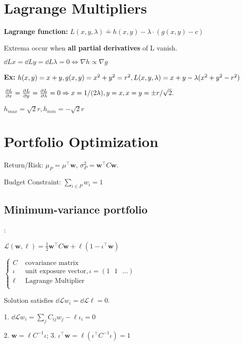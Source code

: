 \section{Lagrange Multipliers}

\textbf{Lagrange function:} $L(x,y,\lambda) \doteq h(x,y) - \lambda \cdot (g(x,y) - c)$

Extrema occur when \textbf{all partial derivatives} of L vanish.

$\dd{L}{x} = \dd{L}{y} = \dd{L}{\lambda} = 0 \iff \nabla h \propto \nabla g$

\textbf{Ex:} $h(x,y) = x+y,\\ g(x,y)=x^2 + y^2 = r^2, \\ L(x,y,\lambda) = x + y - \lambda(x^2+y^2-r^2)$

$\frac{\partial L}{\partial x} = \frac{\partial L}{\partial y} = \frac{\partial L}{\partial \lambda} = 0 \Rightarrow \\ x=1/(2\lambda), y=x, x=y=\pm r/\sqrt{2}.$

$h_{max} = \sqrt{2}r, h_{min} = -\sqrt{2}r$

\section{Portfolio Optimization}

Return/Risk: $\mu_P = \mu^\top \pmb{w}$, $\sigma^2_P = \pmb{w}^\top C \pmb{w}$.

Budget Constraint: $\sum_{i \in P} w_i = 1$


\subsection{Minimum-variance portfolio}:

$\mathcal{L}(\pmb{w}, \mathcal{\ell}) = \frac{1}{2}\pmb{w}^\top C \pmb{w} + \ell(1-\iota^\top\pmb{w})$

$\begin{cases}
    C & \text{ covariance matrix} \\
    \iota & \text{ unit exposure vector}, \iota = (1\text{ } 1 \text{ } \ldots) \\
    \ell & \text{ Lagrange Multiplier} \\
\end{cases}$

Solution satisfies $\dd{\mathcal{L}}{w_i} = \dd{\mathcal{L}}{\ell} = 0.$

1. $\dd{\mathcal{L}}{w_i} = \sum_j C_{ij}w_j - \ell\iota_i = 0$

2. $\pmb{w} = \ell C^{-1}\iota$; 3. $\iota^\top \pmb{w} = \ell(\iota^\top C^{-1}\iota) = 1$

